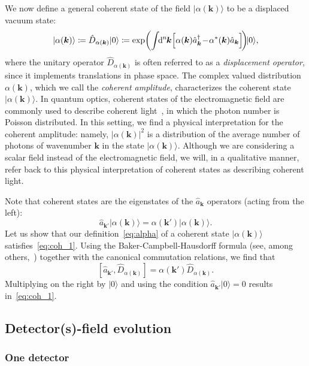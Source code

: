 \documentclass[pra,nofootinbib,floats,aps,twocolumn,tightenlines,superscriptaddress]{revtex4-1}
\renewcommand*\d[2][]{%
	\mathrm{d}%
	\ifx\relax#1\relax\else
	\rule{-0.02em}{1.5ex}^{#1}\rule{0.08em}{0ex}\!
	\fi
	#2\,
}
\newcommand{\ket}[1]{| {#1} \rangle}
\renewcommand{\a}[1]{\hat{a}_{\bm{#1}}}
\newcommand{\ad}[1]{\hat{a}_{\bm{#1}}^\dagger}
\newcommand{\alphak}{\ket{\alpha(\bm k)}}
\begin{document}
We now define a general coherent state of the field $\ket{\alpha(\bm k)}$ to be a displaced vacuum state:
\begin{equation}
\label{eq:alpha}
	\ket{\alpha(\bm{k})}
	\coloneqq
	\hat{D}_{\alpha(\bm{k})}\ket{0}
	\coloneqq
	\exp\!
	\left(\int\!\!\d[n]{\bm{k}}\!\!\left[\alpha(\bm{k})\ad{k}
	\!-\!
	\alpha^*(\bm{k})\a{k}\right]\!\right)
	\!\!\ket{0},
\end{equation}
where the unitary operator $\hat{D}_{\alpha(\bm{k})}$ is often referred to as a \textit{displacement operator}, since it implements translations in phase space. The complex valued distribution $\alpha(\bm k)$, which we call the \textit{coherent amplitude}, characterizes the coherent state $\ket{\alpha(\bm k)}$. In quantum optics, coherent states of the electromagnetic field are commonly used to describe coherent light~\cite{scully1999}, in which the photon number is Poisson distributed. In this setting, we find a physical interpretation for the coherent amplitude: namely, $|\alpha(\bm k)|^2$ is a distribution of the average number of photons of wavenumber $\bm k$ in the state $\alphak$. Although we are considering a scalar field instead of the electromagnetic field, we will, in a qualitative manner, refer back to this physical interpretation of coherent states as describing coherent light.

Note that coherent states are the eigenstates of the $\a{k}$ operators (acting from the left):
\begin{equation}
\label{eq:coh_1}
	\a{k'}\ket{\alpha(\bm{k})}=\alpha(\bm{k'})\ket{\alpha(\bm{k})}.
\end{equation}
Let us show that our definition~\eqref{eq:alpha} of a coherent state $\ket{\alpha(\bm{k})}$ satisfies~\eqref{eq:coh_1}. Using the Baker-Campbell-Hausdorff formula (see, among others,~\cite{Truax1988}) together with the canonical commutation relations, we find that
\begin{equation}
\label{eq:commutator}
	\left[
	\a{k'},\hat{D}_{\alpha(\bm{k})}
	\right]=
	\alpha(\bm{k}')\hat{D}_{\alpha(\bm{k})}.
\end{equation}
Multiplying on the right by $\ket{0}$ and using the condition $\a{k'}\ket{0}=0$ results in~\eqref{eq:coh_1}.

\subsection{Detector(s)-field evolution}
\label{sec:UDW}

\subsubsection{One detector}
\end{document}
